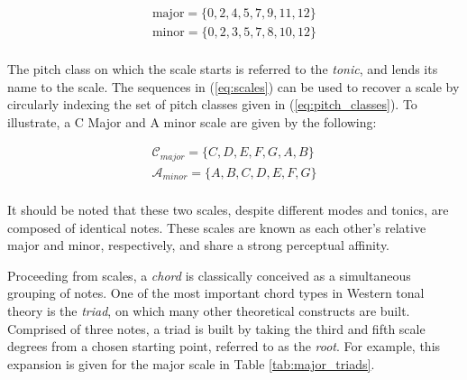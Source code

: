 \begin{centering}
\begin{align*}
\text{major} = \{0, 2, 4, 5, 7, 9, 11, 12\} \\
\text{minor} = \{0, 2, 3, 5, 7, 8, 10, 12\} \\
\end{align*}
\label{eq:scales}
\end{centering}

The pitch class on which the scale starts is referred to the \emph{tonic}, and lends its name to the scale.
The sequences in (\ref{eq:scales}) can be used to recover a scale by circularly indexing the set of pitch classes given in (\ref{eq:pitch_classes}).
To illustrate, a C Major and A minor scale are given by the following:

\begin{align*}
\mathcal{C}_{major} = \{C, D, E, F, G, A, B\} \\
\mathcal{A}_{minor} = \{A, B, C, D, E, F, G\} \\
\end{align*}

\noindent It should be noted that these two scales, despite different modes and tonics, are composed of identical notes.
These scales are known as each other's relative major and minor, respectively, and share a strong perceptual affinity.


Proceeding from scales, a \emph{chord} is classically conceived as a simultaneous grouping of notes.
One of the most important chord types in Western tonal theory is the \emph{triad}, on which many other theoretical constructs are built.
Comprised of three notes, a triad is built by taking the third and fifth scale degrees from a chosen starting point, referred to as the \emph{root}.
For example, this expansion is given for the major scale in Table \ref{tab:major_triads}.

